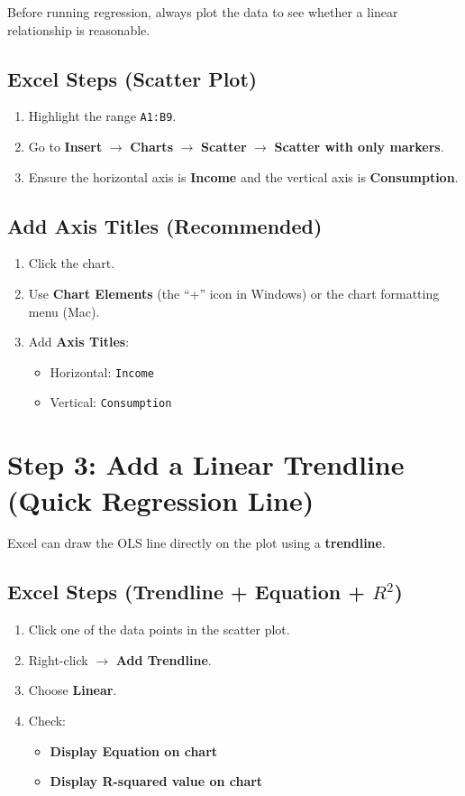 \documentclass[11pt]{article}
\begin{document}
\begin{tcolorbox}[colback=gray!5, colframe=black!40, title=Why we plot first]
Before running regression, always plot the data to see whether a linear relationship is reasonable.
\end{tcolorbox}

\subsection*{Excel Steps (Scatter Plot)}
\begin{enumerate}
  \item Highlight the range \texttt{A1:B9}.
  \item Go to \textbf{Insert} $\rightarrow$ \textbf{Charts} $\rightarrow$ \textbf{Scatter} $\rightarrow$ \textbf{Scatter with only markers}.
  \item Ensure the horizontal axis is \textbf{Income} and the vertical axis is \textbf{Consumption}.
\end{enumerate}

\subsection*{Add Axis Titles (Recommended)}
\begin{enumerate}
  \item Click the chart.
  \item Use \textbf{Chart Elements} (the ``+'' icon in Windows) or the chart formatting menu (Mac).
  \item Add \textbf{Axis Titles}:
  \begin{itemize}
    \item Horizontal: \texttt{Income}
    \item Vertical: \texttt{Consumption}
  \end{itemize}
\end{enumerate}

\section*{Step 3: Add a Linear Trendline (Quick Regression Line)}
Excel can draw the OLS line directly on the plot using a \textbf{trendline}.

\subsection*{Excel Steps (Trendline + Equation + $R^2$)}
\begin{enumerate}
  \item Click one of the data points in the scatter plot.
  \item Right-click $\rightarrow$ \textbf{Add Trendline}.
  \item Choose \textbf{Linear}.
  \item Check:
  \begin{itemize}
    \item \textbf{Display Equation on chart}
    \item \textbf{Display R-squared value on chart}
  \end{itemize}
\end{enumerate}
\end{document}
